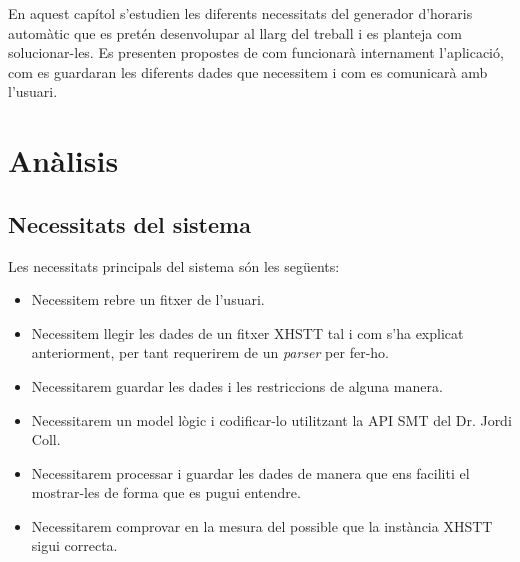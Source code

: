 \documentclass[11pt,a4paper,twoside]{report}
\begin{document}
  En aquest capítol s'estudien les diferents necessitats del generador d'horaris automàtic que es pretén desenvolupar al llarg del treball
  i es planteja com solucionar-les. 
  Es presenten propostes de com funcionarà internament l'aplicació, 
  com es guardaran les diferents dades que necessitem i com es comunicarà amb l'usuari. 



  \section{Anàlisis}
  \subsection{Necessitats del sistema}
  Les necessitats principals del sistema són les següents: 
  \begin{itemize}
    \item Necessitem rebre un fitxer de l'usuari.
    \item Necessitem llegir les dades de un fitxer XHSTT tal i com s'ha explicat anteriorment, per tant requerirem de un \textit{parser} per fer-ho.
    \item Necessitarem guardar les dades i les restriccions de alguna manera.
    \item Necessitarem un model lògic i codificar-lo utilitzant la API SMT del Dr. Jordi Coll. 
    \item Necessitarem processar i guardar les dades de manera que ens faciliti el mostrar-les de forma que es pugui entendre.
    \item Necessitarem comprovar en la mesura del possible que la instància XHSTT sigui correcta.
  \end{itemize}
\end{document}
